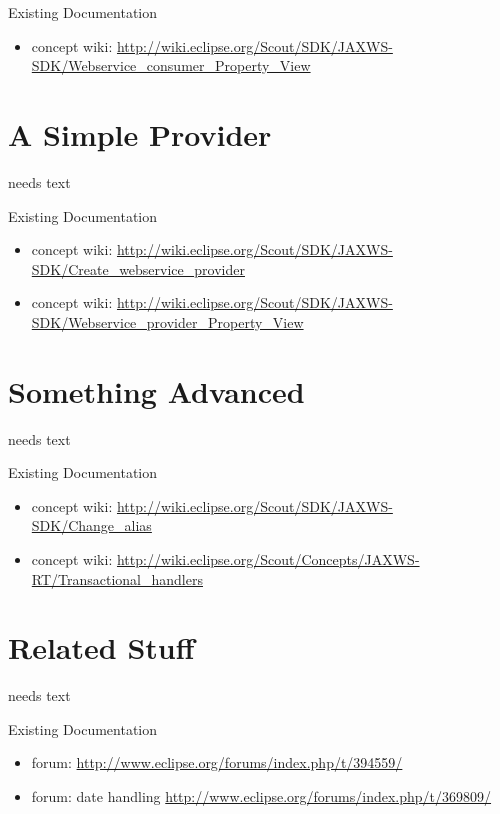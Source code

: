 \documentclass[a4paper,10pt,twoside]{book}
\begin{document}
\noindent Existing Documentation
\begin{itemize}
  \item concept wiki: \url{http://wiki.eclipse.org/Scout/SDK/JAXWS-SDK/Webservice_consumer_Property_View}
\end{itemize}

\section{A Simple Provider}
needs text

\noindent Existing Documentation
\begin{itemize}
  \item concept wiki: \url{http://wiki.eclipse.org/Scout/SDK/JAXWS-SDK/Create_webservice_provider}
  \item concept wiki: \url{http://wiki.eclipse.org/Scout/SDK/JAXWS-SDK/Webservice_provider_Property_View}
\end{itemize}

\section{Something Advanced}
needs text

\noindent Existing Documentation
\begin{itemize}
  \item concept wiki: \url{http://wiki.eclipse.org/Scout/SDK/JAXWS-SDK/Change_alias}
  \item concept wiki: \url{http://wiki.eclipse.org/Scout/Concepts/JAXWS-RT/Transactional_handlers}
\end{itemize}

\section{Related Stuff}
needs text

\noindent Existing Documentation
\begin{itemize}
  \item forum: \url{http://www.eclipse.org/forums/index.php/t/394559/}
  \item forum: date handling \url{http://www.eclipse.org/forums/index.php/t/369809/}
\end{itemize}
\end{document}
